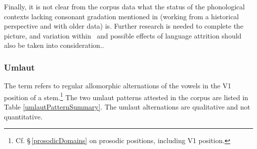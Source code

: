 Finally, it is not clear from the corpus data what the status of the phonological contexts lacking consonant gradation mentioned in \citet[21]{Sammallahti1998} (working from a historical perspective and with older data) is. Further research is needed to complete the picture, and %
variation within \PS\ and possible effects of language attrition should also be taken into consideration..



\subsubsection{Umlaut}\label{umlaut}
The term  refers to regular allomorphic alternations of the vowels in the V1 position of a stem.\footnote{Cf. §\,\ref{prosodicDomains} on prosodic positions, including V1 position.} 
The two umlaut patterns attested in the corpus are listed in Table \vref{umlautPatternSummary}. %
The umlaut alternations are qualitative and not quantitative. %
